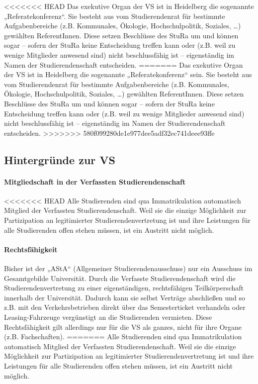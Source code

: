 <<<<<<< HEAD
Das exekutive Organ der VS ist in Heidelberg die sogenannte
„Referatekonferenz“.  Sie besteht aus vom Studierendenrat für bestimmte
Aufgabenbereiche (z.B.  Kommunales, Ökologie, Hochschulpolitik, Soziales,
\dots) gewählten ReferentInnen. Diese setzen Beschlüsse des StuRa um und können
sogar -- sofern der StuRa keine Entscheidung treffen kann oder (z.B. weil zu
wenige Mitglieder anwesend sind) nicht beschlussfähig ist -- eigenständig im
Namen der Studierendenschaft entscheiden.
=======
Das exekutive Organ der VS ist in Heidelberg die sogenannte „Referatekonferenz“ sein.
Sie besteht aus vom Studierendenrat für bestimmte Aufgabenbereiche (z.B.
Kommunales, Ökologie, Hochschulpolitik, Soziales, \dots) gewählten
ReferentInnen. Diese setzen Beschlüsse des StuRa um und können sogar --
sofern der StuRa keine Entscheidung treffen kann oder (z.B. weil zu
wenige Mitglieder anwesend sind) nicht beschlussfähig ist --
eigenständig im Namen der Studierendenschaft entscheiden.
>>>>>>> 580f099280de1e977dee5adf32ec741deee93ffe

\subsection{Hintergründe zur VS}

\paragraph{Mitgliedschaft in der Verfassten Studierendenschaft}

<<<<<<< HEAD
Alle Studierenden sind qua Immatrikulation automatisch Mitglied der Verfassten
Studierendenschaft. Weil sie die einzige Möglichkeit zur Partizipation an
legitimierter Studierendenvertretung ist und ihre Leistungen für alle
Studierenden offen stehen müssen, ist ein Austritt nicht möglich.

\paragraph{Rechtsfähigkeit}

Bisher ist der „AStA“ (Allgemeiner Studierendenausschuss) nur ein Ausschuss im
Gesamtgebilde Universität. Durch die Verfasste Studierendenschaft wird die
Studierendenvertretung zu einer eigenständigen, rechtsfähigen Teilkörperschaft
innerhalb der Universität. Dadurch kann sie selbst Verträge abschließen und so
z.B. mit den Verkehrsbetrieben direkt über das Semesterticket verhandeln oder
Leasing-Fahrzeuge vergünstigt an die Studierenden vermieten.  Diese
Rechtsfähigkeit gilt allerdings nur für die VS als ganzes, nicht für ihre
Organe (z.B. Fachschaften).
=======
Alle Studierenden sind qua Immatrikulation automatisch Mitglied der
Verfassten Studierendenschaft. Weil sie die einzige Möglichkeit zur
Partizipation an legitimierter Studierendenvertretung ist und ihre
Leistungen für alle Studierenden offen stehen müssen, ist ein Austritt
nicht möglich.

